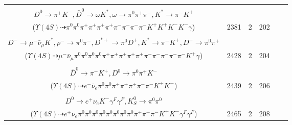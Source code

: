 \documentclass[landscape]{article}
\newcounter{rownumbers}
\newcommand\rn{\stepcounter{rownumbers}\arabic{rownumbers}}
\newcommand{\EOLP}{\\ \hline} %
\newcommand{\topoTags}[1]{#1} %
\begin{document}
\begin{longtable}{clcccc}
\rn & \makecell[l]{ $ 
\Upsilon(4S) \rightarrow B^{0} \bar{B}^{0} ,
B^{0} \rightarrow \pi^{0} \bar{D}^{0} ,
\bar{B}^{0} \rightarrow K^{-} D^{*+} \bar{D}^{*0} ,
\bar{D}^{0} \rightarrow \pi^{+} \pi^{-} \pi^{-} K^{+} ,
D^{*+} \rightarrow \pi^{+} D^{0} ,
\bar{D}^{*0} \rightarrow \bar{D}^{0} \gamma ,
$ \\ $
D^{0} \rightarrow \pi^{+} K^{-} ,
\bar{D}^{0} \rightarrow \omega K^{*} ,
\omega \rightarrow \pi^{0} \pi^{+} \pi^{-} ,
K^{*} \rightarrow \pi^{-} K^{+} 
$ \\ ($
\Upsilon(4S) \dashrightarrow \pi^{0} \pi^{0} \pi^{+} \pi^{+} \pi^{+} \pi^{+} \pi^{-} \pi^{-} \pi^{-} \pi^{-} K^{+} K^{+} K^{-} K^{-} \gamma 
$) } & \topoTags{2381 & }2 & 202 \EOLP

\rn & \makecell[l]{ $ 
\Upsilon(4S) \rightarrow B^{0} \bar{B}^{0} ,
B^{0} \rightarrow \rho^{0} \rho^{0} \pi^{+} \omega D^{-} ,
\bar{B}^{0} \rightarrow \rho^{-} D^{*+} \gamma ,
\rho^{0} \rightarrow \pi^{+} \pi^{-} ,
\rho^{0} \rightarrow \pi^{+} \pi^{-} ,
\omega \rightarrow \pi^{0} \pi^{+} \pi^{-} ,
$ \\ $
D^{-} \rightarrow \mu^{-} \bar{\nu}_{\mu} K^{*} ,
\rho^{-} \rightarrow \pi^{0} \pi^{-} ,
D^{*+} \rightarrow \pi^{0} D^{+} ,
K^{*} \rightarrow \pi^{-} K^{+} ,
D^{+} \rightarrow \pi^{0} \pi^{+} 
$ \\ ($
\Upsilon(4S) \dashrightarrow \mu^{-} \bar{\nu}_{\mu} \pi^{0} \pi^{0} \pi^{0} \pi^{0} \pi^{+} \pi^{+} \pi^{+} \pi^{+} \pi^{+} \pi^{-} \pi^{-} \pi^{-} \pi^{-} \pi^{-} K^{+} \gamma 
$) } & \topoTags{2428 & }2 & 204 \EOLP

\rn & \makecell[l]{ $ 
\Upsilon(4S) \rightarrow B^{0} \bar{B}^{0} ,
B^{0} \rightarrow \rho^{+} D^{*-} ,
\bar{B}^{0} \rightarrow e^{-} \bar{\nu}_{e} D^{*+} ,
\rho^{+} \rightarrow \pi^{0} \pi^{+} ,
D^{*-} \rightarrow \pi^{-} \bar{D}^{0} ,
D^{*+} \rightarrow \pi^{+} D^{0} ,
$ \\ $
\bar{D}^{0} \rightarrow \pi^{-} K^{+} ,
D^{0} \rightarrow \pi^{0} \pi^{+} K^{-} 
$ \\ ($
\Upsilon(4S) \dashrightarrow e^{-} \bar{\nu}_{e} \pi^{0} \pi^{0} \pi^{+} \pi^{+} \pi^{+} \pi^{-} \pi^{-} K^{+} K^{-} 
$) } & \topoTags{2439 & }2 & 206 \EOLP

\rn & \makecell[l]{ $ 
\Upsilon(4S) \rightarrow B^{0} \bar{B}^{0} ,
B^{0} \rightarrow \pi^{0} \rho^{+} \eta D^{-} ,
\bar{B}^{0} \rightarrow \pi^{0} D^{0} ,
\rho^{+} \rightarrow \pi^{0} \pi^{+} ,
\eta \rightarrow \pi^{0} \pi^{0} \pi^{0} ,
D^{-} \rightarrow \pi^{-} \pi^{-} K_{S}^{0} K^{+} ,
$ \\ $
D^{0} \rightarrow e^{+} \nu_{e} K^{-} \gamma^{F} \gamma^{F} ,
K_{S}^{0} \rightarrow \pi^{0} \pi^{0} 
$ \\ ($
\Upsilon(4S) \dashrightarrow e^{+} \nu_{e} \pi^{0} \pi^{0} \pi^{0} \pi^{0} \pi^{0} \pi^{0} \pi^{0} \pi^{0} \pi^{+} \pi^{-} \pi^{-} K^{+} K^{-} \gamma^{F} \gamma^{F} 
$) } & \topoTags{2465 & }2 & 208 \EOLP


\end{longtable}
\end{document}
